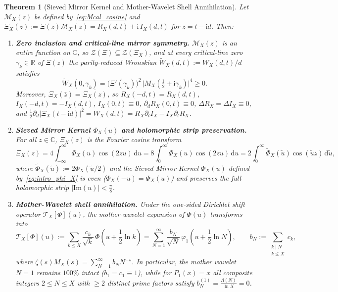 \documentclass[11pt,reqno]{amsart}
\newtheorem{theorem}{Theorem}[section]
\theoremstyle{definition}
\theoremstyle{remark}
\numberwithin{equation}{section}
\newcommand{\R}{\mathbb{R}}
\newcommand{\C}{\mathbb{C}}
\newcommand{\dd}{\mathrm{d}}
\newcommand{\ii}{\mathrm{i}}
\newcommand{\Ima}{\mathrm{Im}}
\begin{document}
\begin{theorem}[Sieved Mirror Kernel and Mother-Wavelet Shell Annihilation]\label{thm:sieved_mirror_kernel}
Let $\mathcal{M}_X(z)$ be defined by~\eqref{eq:Mcal_cosine} and $\Xi_X(z) := \Xi(z)\mathcal{M}_X(z) = R_X(d,t) + \ii\,I_X(d,t)$ for $z = t - \ii d$. Then:
\begin{enumerate}[label=\textup{(\alph*)},leftmargin=2.2em]
\item \textbf{Zero inclusion and critical-line mirror symmetry.} $\mathcal{M}_X(z)$ is an entire function on $\C$, so $\mathcal{Z}(\Xi) \subseteq \mathcal{Z}(\Xi_X)$, and at every critical-line zero $\gamma_k \in \R$ of $\Xi(z)$ the parity-reduced Wronskian $\widetilde{W}_X(d,t) := W_X(d,t)/d$ satisfies
\begin{equation}\label{eq:Wtilde_zero_slope}
\widetilde{W}_X(0,\gamma_k) = \bigl(\Xi'(\gamma_k)\bigr)^2\,\bigl|M_X(\tfrac{1}{2} + \ii\gamma_k)\bigr|^4 \ge 0.
\end{equation}
Moreover, $\Xi_X(\bar{z}) = \overline{\Xi_X(z)}$, so $R_X(-d,t) = R_X(d,t)$, $I_X(-d,t) = -I_X(d,t)$, $I_X(0,t) \equiv 0$, $\partial_d R_X(0,t) \equiv 0$, $\Delta R_X = \Delta I_X \equiv 0$, and $\frac{1}{2}\partial_d|\Xi_X(t-\ii d)|^2 = W_X(d,t) = R_X\partial_t I_X - I_X\partial_t R_X$.
\item \textbf{Sieved Mirror Kernel $\Phi_X(u)$ and holomorphic strip preservation.} For all $z \in \C$, $\Xi_X(z)$ is the Fourier cosine transform
\begin{equation}\label{eq:XiX_fourier}
\Xi_X(z) = 4\int_{-\infty}^{\infty} \Phi_X(u)\cos(2zu)\,\dd u = 8\int_0^{\infty} \Phi_X(u)\cos(2zu)\,\dd u = 2\int_0^{\infty} \widetilde{\Phi}_X(\tilde{u})\cos(\tilde{u}z)\,\dd\tilde{u},
\end{equation}
where $\widetilde{\Phi}_X(\tilde{u}) := 2\Phi_X(\tilde{u}/2)$ and the \emph{Sieved Mirror Kernel} $\Phi_X(u)$ defined by~\eqref{eq:intro_phi_X} is even ($\Phi_X(-u) = \Phi_X(u)$) and preserves the full holomorphic strip $|\Ima(u)| < \frac{\pi}{8}$.
\item \textbf{Mother-Wavelet shell annihilation.} Under the one-sided Dirichlet shift operator $\mathcal{T}_X[\Phi](u)$, the mother-wavelet expansion of $\Phi(u)$ transforms into
\begin{equation}\label{eq:TX_mother_wavelet}
\mathcal{T}_X[\Phi](u) := \sum_{k \le X} \frac{c_k}{\sqrt{k}}\,\Phi\!\left(u + \frac{1}{2}\ln k\right) = \sum_{N=1}^{\infty} \frac{b_N}{\sqrt{N}}\,\varphi_1\!\left(u + \frac{1}{2}\ln N\right), \qquad b_N := \sum_{\substack{k \mid N \\ k \le X}} c_k,
\end{equation}
where $\zeta(s)M_X(s) = \sum_{N=1}^{\infty} b_N N^{-s}$. In particular, the mother wavelet $N = 1$ remains $100\%$ intact ($b_1 = c_1 \equiv 1$), while for $P_1(x) = x$ all composite integers $2 \le N \le X$ with $\ge 2$ distinct prime factors satisfy $b_N^{(1)} = \frac{\Lambda(N)}{\ln X} = 0$.
\end{enumerate}
\end{theorem}
\end{document}
